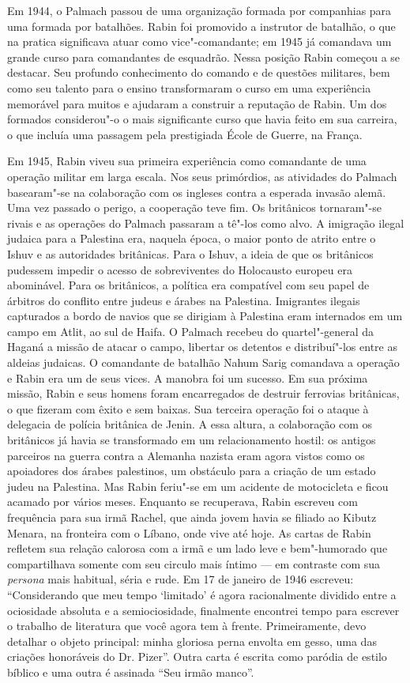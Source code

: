 Em 1944, o Palmach passou de uma organização formada por companhias para
uma formada por batalhões. Rabin foi promovido a instrutor de batalhão,
o que na pratica significava atuar como vice"-comandante;
em 1945 já comandava um grande curso para comandantes de esquadrão.
Nessa posição Rabin começou a se destacar. Seu profundo conhecimento do
comando e de questões militares, bem como seu talento para o ensino
transformaram o curso em uma experiência memorável para muitos e
ajudaram a construir a reputação de Rabin. Um dos formados considerou"-o
o mais significante curso que havia feito em sua carreira, o que incluía
uma passagem pela prestigiada École de Guerre, na França.

Em 1945, Rabin viveu sua primeira experiência como comandante de uma
operação militar em larga escala. Nos seus primórdios, as atividades do
Palmach basearam"-se na colaboração com os ingleses contra a esperada
invasão alemã. Uma vez passado o perigo, a cooperação teve fim. Os
britânicos tornaram"-se rivais e as operações
do Palmach passaram a tê"-los como alvo. A imigração ilegal judaica para
a Palestina era, naquela época, o maior ponto de atrito entre o Ishuv e
as autoridades britânicas. Para o Ishuv, a ideia de que os britânicos
pudessem impedir o acesso de sobreviventes do Holocausto europeu era
abominável. Para os britânicos, a política era compatível com seu papel
de árbitros do conflito entre judeus e árabes na Palestina. Imigrantes
ilegais capturados a bordo de navios que se dirigiam à Palestina eram
internados em um campo em Atlit, ao sul de Haifa. O Palmach recebeu do
quartel"-general da Haganá a missão de atacar o campo, libertar os
detentos e distribuí"-los entre as aldeias judaicas. O comandante de
batalhão Nahum Sarig comandava a operação e Rabin era um de seus vices.
A manobra foi um sucesso. Em sua próxima missão, Rabin e seus homens
foram encarregados de destruir ferrovias britânicas, o que fizeram com
êxito e sem baixas. Sua terceira operação foi o ataque à delegacia de
polícia britânica de Jenin. A essa altura, a colaboração com os
britânicos já havia se transformado em um relacionamento hostil: os
antigos parceiros na guerra contra a Alemanha nazista eram agora vistos
como os apoiadores dos árabes palestinos, um obstáculo para a criação
de um estado judeu na Palestina. Mas Rabin feriu"-se em um acidente de
motocicleta e ficou acamado por vários meses. Enquanto se recuperava,
Rabin escreveu com frequência para sua irmã Rachel, que ainda jovem
havia se filiado ao Kibutz Menara, na fronteira com o Líbano, onde vive
até hoje. As cartas de Rabin refletem sua relação calorosa com a irmã e
um lado leve e bem"-humorado que compartilhava somente com seu circulo
mais íntimo --- em contraste com sua \textit{persona} mais habitual, séria
e rude. Em 17 de janeiro de 1946 escreveu: ``Considerando que meu tempo
`limitado' é agora racionalmente dividido entre a ociosidade absoluta e
a semiociosidade, finalmente encontrei tempo para escrever o
trabalho de literatura que você agora tem à frente. Primeiramente, devo
detalhar o objeto principal: minha gloriosa perna envolta em gesso, uma
das criações honoráveis do Dr. Pizer''. Outra carta é escrita como
paródia de estilo bíblico e uma outra é assinada ``Seu irmão manco''.

